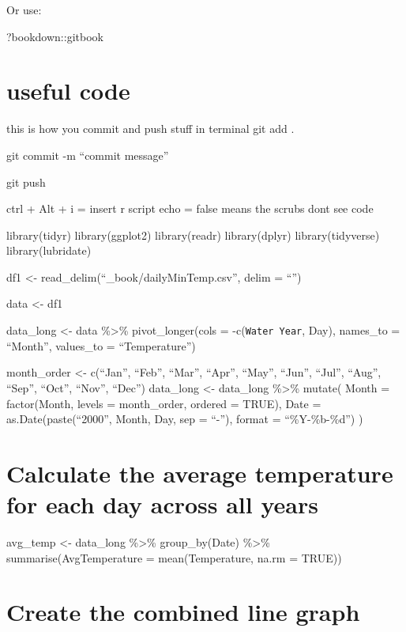 \documentclass[
]{book}
\newenvironment{Shaded}{\begin{snugshade}}{\end{snugshade}}
\newcommand{\NormalTok}[1]{#1}
\newcommand{\SpecialCharTok}[1]{\textcolor[rgb]{0.00,0.00,0.00}{#1}}
\theoremstyle{definition}
\theoremstyle{definition}
\theoremstyle{definition}
\theoremstyle{definition}
\theoremstyle{remark}
\begin{document}
Or use:

\begin{Shaded}
\begin{Highlighting}[]
\NormalTok{?bookdown}\SpecialCharTok{::}\NormalTok{gitbook}
\end{Highlighting}
\end{Shaded}

\hypertarget{useful-code}{%
\chapter{useful code}\label{useful-code}}

this is how you commit and push stuff in terminal
git add .

git commit -m ``commit message''

git push

ctrl + Alt + i = insert r script
echo = false means the scrubs dont see code

library(tidyr)
library(ggplot2)
library(readr)
library(dplyr)
library(tidyverse)
library(lubridate)

df1 \textless- read\_delim(``\_book/dailyMinTemp.csv'', delim = ``\textbar{}'')

data \textless- df1

data\_long \textless- data \%\textgreater\%
pivot\_longer(cols = -c(\texttt{Water\ Year}, Day),
names\_to = ``Month'',
values\_to = ``Temperature'')

month\_order \textless- c(``Jan'', ``Feb'', ``Mar'', ``Apr'', ``May'', ``Jun'', ``Jul'', ``Aug'', ``Sep'', ``Oct'', ``Nov'', ``Dec'')
data\_long \textless- data\_long \%\textgreater\%
mutate(
Month = factor(Month, levels = month\_order, ordered = TRUE),
Date = as.Date(paste(``2000'', Month, Day, sep = ``-''), format = ``\%Y-\%b-\%d'')
)

\hypertarget{calculate-the-average-temperature-for-each-day-across-all-years}{%
\chapter{Calculate the average temperature for each day across all years}\label{calculate-the-average-temperature-for-each-day-across-all-years}}

avg\_temp \textless- data\_long \%\textgreater\%
group\_by(Date) \%\textgreater\%
summarise(AvgTemperature = mean(Temperature, na.rm = TRUE))

\hypertarget{create-the-combined-line-graph}{%
\chapter{Create the combined line graph}\label{create-the-combined-line-graph}}
\end{document}
